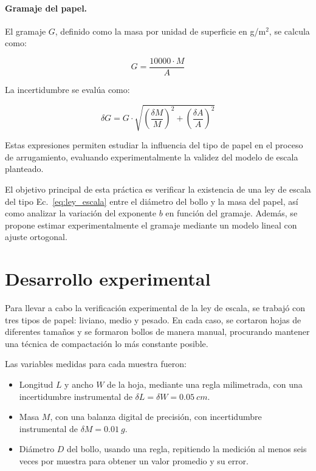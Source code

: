 \documentclass[12pt,a4]{article}
\begin{document}
\paragraph{Gramaje del papel.} El gramaje \( G \), definido como la masa por unidad de superficie en g/m\(^2\), se calcula como:

\begin{equation}
G = \frac{10000 \cdot M}{A}
\label{eq:gramaje}
\end{equation}

La incertidumbre se evalúa como:

\begin{equation}
\delta G = G \cdot \sqrt{\left( \frac{\delta M}{M} \right)^2 + \left( \frac{\delta A}{A} \right)^2}
\label{eq:delta_gramaje}
\end{equation}

Estas expresiones permiten estudiar la influencia del tipo de papel en el proceso de arrugamiento, evaluando experimentalmente la validez del modelo de escala planteado.

\bigskip

El objetivo principal de esta práctica es verificar la existencia de una ley de escala del tipo Ec.~\eqref{eq:ley_escala} entre el diámetro del bollo y la masa del papel, así como analizar la variación del exponente \( b \) en función del gramaje. Además, se propone estimar experimentalmente el gramaje mediante un modelo lineal con ajuste ortogonal. 


\section{Desarrollo experimental}

Para llevar a cabo la verificación experimental de la ley de escala, se trabajó con tres tipos de papel: liviano, medio y pesado. En cada caso, se cortaron hojas de diferentes tamaños y se formaron bollos de manera manual, procurando mantener una técnica de compactación lo más constante posible.

Las variables medidas para cada muestra fueron:

\begin{itemize}
    \item Longitud \( L \) y ancho \( W \) de la hoja, mediante una regla milimetrada, con una incertidumbre instrumental de \( \delta L = \delta W = \SI{0.05}{cm} \).
    \item Masa \( M \), con una balanza digital de precisión, con incertidumbre instrumental de \( \delta M = \SI{0.01}{g} \).
    \item Diámetro \( D \) del bollo, usando una regla, repitiendo la medición al menos seis veces por muestra para obtener un valor promedio y su error.
\end{itemize}
\end{document}
